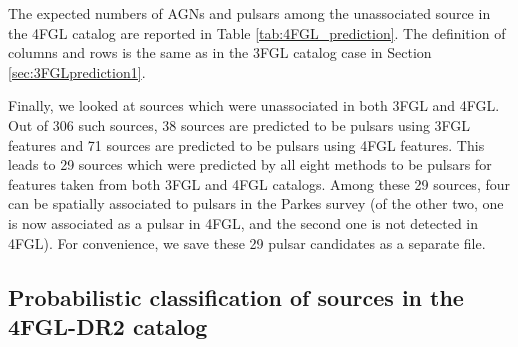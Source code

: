 The expected numbers of AGNs and pulsars among the unassociated source in the 4FGL catalog are reported in Table \ref{tab:4FGL_prediction}.
The definition of columns and rows is the same as in the 3FGL catalog case in Section \ref{sec:3FGLprediction1}.

\begin{table}[!h]
    \vspace{0.2cm}
    \caption{Expected numbers of pulsars and AGNs among unassociated sources in the 4FGL catalog \citep{2020ApJS..247...33A}.
    For definitions see Table \ref{tab:3FGL_prediction}.}
    \label{tab:4FGL_prediction}
\end{table}

Finally, we looked at sources which were unassociated in both 3FGL and 4FGL. Out of 306 such sources, 38 sources are predicted to be pulsars using 3FGL features and 71 sources are predicted to be pulsars using 4FGL features. This leads to 29 sources which were predicted by all eight methods to be pulsars for features taken from both 3FGL and 4FGL catalogs. Among these 29 sources, four can be spatially associated to pulsars in the Parkes survey (of the other two, one is now associated as a pulsar in 4FGL, and the second one is not detected in 4FGL).  For convenience, we save these 29 pulsar candidates as a separate file.



\subsection{Probabilistic classification of sources in the 4FGL-DR2 catalog}

